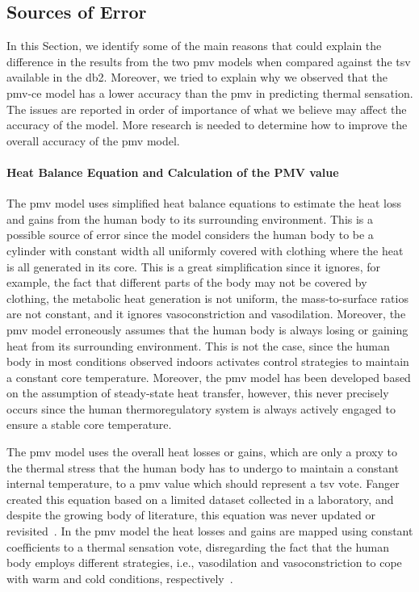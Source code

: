 \subsection{Sources of Error}\label{subsec:sources-of-error}
In this Section, we identify some of the main reasons that could explain the difference in the results from the two \ac{pmv} models when compared against the \ac{tsv} available in the \ac{db2}.
Moreover, we tried to explain why we observed that the \ac{pmv-ce} model has a lower accuracy than the \ac{pmv} in predicting thermal sensation.
The issues are reported in order of importance of what we believe may affect the accuracy of the model.
More research is needed to determine how to improve the overall accuracy of the \ac{pmv} model.

\paragraph{Heat Balance Equation and Calculation of the PMV value}
The \ac{pmv} model uses simplified heat balance equations to estimate the heat loss and gains from the human body to its surrounding environment.
This is a possible source of error since the model considers the human body to be a cylinder with constant width all uniformly covered with clothing where the heat is all generated in its core.
This is a great simplification since it ignores, for example, the fact that different parts of the body may not be covered by clothing, the metabolic heat generation is not uniform, the mass-to-surface ratios are not constant, and it ignores vasoconstriction and vasodilation.
Moreover, the \ac{pmv} model erroneously assumes that the human body is always losing or gaining heat from its surrounding environment.
This is not the case, since the human body in most conditions observed indoors activates control strategies to maintain a constant core temperature.
Moreover, the \ac{pmv} model has been developed based on the assumption of steady-state heat transfer, however, this never precisely occurs since the human thermoregulatory system is always actively engaged to ensure a stable core temperature.

The \ac{pmv} model uses the overall heat losses or gains, which are only a proxy to the thermal stress that the human body has to undergo to maintain a constant internal temperature, to a \ac{pmv} value which should represent a \ac{tsv} vote.
Fanger created this equation based on a limited dataset collected in a laboratory, and despite the growing body of literature, this equation was never updated or revisited~\cite{Fanger1970}.
In the \ac{pmv} model the heat losses and gains are mapped using constant coefficients to a thermal sensation vote, disregarding the fact that the human body employs different strategies, i.e., vasodilation and vasoconstriction to cope with warm and cold conditions, respectively~\cite{romanovsky_thermoregulation_2018}.


